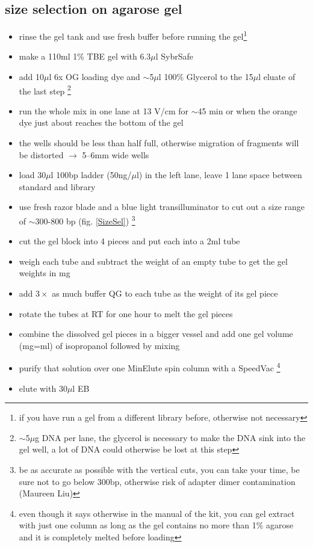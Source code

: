 \subsection
{size selection on agarose gel}\label{sizeSelection}
\begin{itemize}
\item rinse the gel tank and use fresh buffer before running the gel\footnote{if you have run a gel from a different library before, otherwise not necessary} 
\item make a 110ml 1\% TBE gel with 6.3$\mu$l SybrSafe
\item add 10$\mu$l 6x OG loading dye and $\sim$5$\mu$l 100\% Glycerol to the 15$\mu$l eluate of the last step \footnote{$\sim$5$\mu$g DNA per lane, the glycerol is necessary to make the DNA sink into the gel well, a lot of DNA could otherwise be lost at this step}
\item run the whole mix in one lane at 13 V/cm for $\sim$45 min or when the orange dye just about reaches the bottom of the gel
\item the wells should be less than half full, otherwise migration of fragments will be distorted $\rightarrow$ 5--6mm wide wells
\item load 30$\mu$l 100bp ladder (50ng/$\mu$l) in the left lane, leave 1 lane space between standard and library
\item use fresh razor blade and a blue light transilluminator to cut out a size range of $\sim$300-800 bp (fig. \ref{SizeSel}) \footnote{be as accurate as possible with the vertical cuts, you can take your time, be sure not to go below 300bp, otherwise risk of adapter dimer contamination (Maureen Liu)}
\item cut the gel block into 4 pieces and put each into a 2ml tube
\item weigh each tube and subtract the weight of an empty tube to get the gel weights in mg
\item add $3 \times$ as much buffer QG to each tube as the weight of its gel piece
\item rotate the tubes at RT for one hour to melt the gel pieces 
\item combine the dissolved gel pieces in a bigger vessel and add one gel volume (mg=ml) of isopropanol followed by mixing
\item purify that solution over one MinElute spin column with a SpeedVac \footnote{even though it says otherwise in the manual of the kit, you can gel extract with just one column as long as the gel contains no more than 1\% agarose and it is completely melted before loading}
\item elute with 30$\mu$l EB
\end{itemize}
